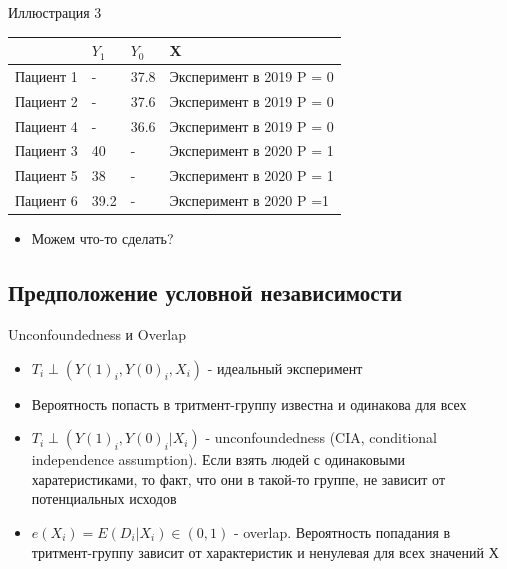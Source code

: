 \begin{frame}{Иллюстрация 3}
\begin{table}[]
\begin{tabular}{l|l|l||l}
&$Y_1$ & $Y_0$ & X \\
\hline
Пациент 1 & - & 37.8 & Эксперимент в 2019 P = 0 \\
Пациент 2 & - & 37.6 & Эксперимент в 2019 P = 0 \\
Пациент 4 & - & 36.6 & Эксперимент в 2019 P = 0  \\
Пациент 3 & 40 & - & Эксперимент в 2020 P = 1 \\
Пациент 5 &38   & - &  Эксперимент в 2020 P = 1 \\
Пациент 6 &39.2 & - & Эксперимент в 2020 P =1
\end{tabular}
\begin{itemize}
        \item Можем что-то сделать?
\end{itemize}
\end{table}

\end{frame} 


\subsection{Предположение условной независимости}

\begin{frame}{Unconfoundedness и Overlap}
\begin{itemize}
   \item $T_i \perp (Y(1)_i, Y(0)_i, X_i)$ - идеальный эксперимент
   \item Вероятность попасть в тритмент-группу известна и одинакова для всех
   \item $T_i \perp (Y(1)_i, Y(0)_i | X_i)$ - unconfoundedness (CIA, conditional independence assumption). Если взять людей с одинаковыми харатеристиками, то факт, что они в такой-то группе, не зависит от потенциальных исходов
   \item $e(X_i)=E(D_i | X_i) \in (0,1) $ - overlap. Вероятность попадания в тритмент-группу зависит от характеристик и ненулевая для всех значений Х
\end{itemize}
\end{frame}



